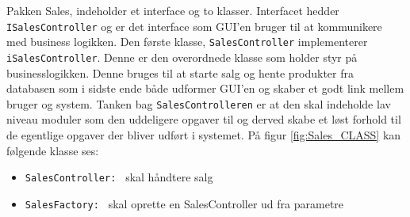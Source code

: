 
\newpage Pakken Sales, indeholder et interface og to klasser. Interfacet hedder \texttt{ISalesController} og er det interface som GUI'en bruger til at kommunikere med business logikken.
Den første klasse, \texttt{SalesController} implementerer \texttt{iSalesController}. Denne er den overordnede klasse som holder styr på businesslogikken. Denne bruges til at starte salg og hente produkter fra databasen som i sidste ende både udformer GUI'en og skaber et godt link mellem bruger og system. Tanken bag \texttt{SalesControlleren} er at den skal indeholde lav niveau moduler som den uddeligere opgaver til og derved skabe et løst forhold til de egentlige opgaver der bliver udført i systemet. På figur \ref{fig:Sales_CLASS} kan følgende klasse ses:

\begin{itemize}
	\item \texttt{SalesController: } skal håndtere salg
	\item \texttt{SalesFactory: } skal oprette en SalesController ud fra parametre
\end{itemize}